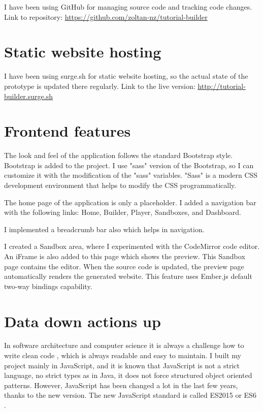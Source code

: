 \documentclass[11pt, a4paper, oneside, openright, medskipamount]{report}
\begin{document}
I have been using GitHub for managing source code and tracking code changes. Link to repository: \url{https://github.com/zoltan-nz/tutorial-builder}

\section{Static website hosting}

I have been using surge.sh \cite{surge} for static website hosting, so the actual state of the prototype is updated there regularly. Link to the live version: \url{http://tutorial-builder.surge.sh}

\section{Frontend features}

The look and feel of the application follows the standard Bootstrap style. Bootstrap is added to the project. I use "sass" version of the Bootstrap, so I can customize it with the modification of the "sass" variables. "Sass" is a modern CSS development environment that helps to modify the CSS programmatically.

The home page of the application is only a placeholder. I added a navigation bar with the following links: Home, Builder, Player, Sandboxes, and Dashboard.

I implemented a breadcrumb bar also which helps in navigation.

I created a Sandbox area, where I experimented with the CodeMirror code editor. An iFrame is also added to this page which shows the preview. This Sandbox page contains the editor. When the source code is updated, the preview page automatically renders the generated website. This feature uses Ember.js default two-way bindings capability.

\section{Data down actions up}

In software architecture and computer science it is always a challenge how to write clean code \cite{clean-code}, which is always readable and easy to maintain. I built my project mainly in JavaScript, and it is known that JavaScript is not a strict language, no strict types as in Java, it does not force structured object oriented patterns. However, JavaScript has been changed a lot in the last few years, thanks to the new version. The new JavaScript standard is called ES2015 or ES6 \cite{es6}.
\end{document}
